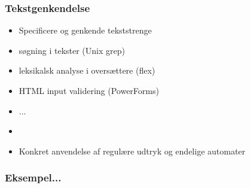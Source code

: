\documentclass[]{beamer}
\begin{document}
\begin{frame}
\frametitle{Tekstgenkendelse}
\begin{itemize}
\item Specificere og genkende tekststrenge
\item søgning i tekster (Unix grep)
\item leksikalsk analyse i oversættere (flex)
\item HTML input validering (PowerForms)
\item ...
\item  
\item Konkret anvendelse af regulære udtryk og endelige automater

\end{itemize}
\end{frame}

\begin{frame}
\frametitle{Eksempel...}
\begin{center}
\end{center}
\end{frame}
\end{document}
